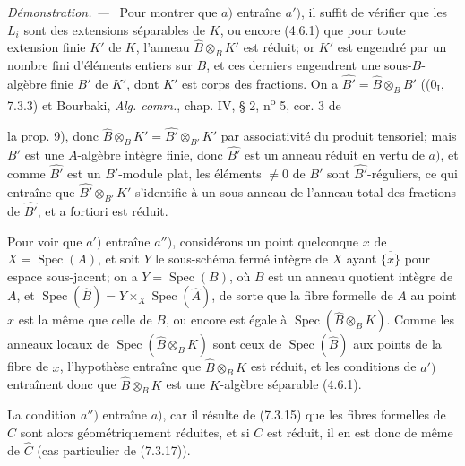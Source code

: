 \documentclass[10pt,oneside]{book}
\newcommand{\oldpage}[2][]{%
  \setcounter{footnote}{0}%
  \marginpar{\scriptsize\textbf{#1}~|~#2}\ignorespaces}
\newenvironment{proof}{%
  \par\medskip\noindent\textit{Démonstration. ---\ }}{\par}
\begin{document}
\begin{proof}
Pour montrer que $a)$ entraîne $a')$, il suffit de vérifier que les $L_i$ sont
des extensions séparables de $K$, ou encore (4.6.1) que pour toute extension
finie $K'$ de $K$, l'anneau $\widehat B\otimes_BK'$ est réduit; or $K'$ est
engendré par un nombre fini d'éléments entiers sur $B$, et ces derniers
engendrent une sous-$B$-algèbre finie $B'$ de $K'$, dont $K'$ est corps des
fractions. On a $\widehat{B'}=\widehat B\otimes_BB'$
((0$_{\mathrm I}$, 7.3.3) et Bourbaki, \emph{Alg. comm.}, chap. IV, § 2,
n\textsuperscript{o} 5, cor. 3 de

\oldpage[IV-2]{210}

la prop. 9), donc
$\widehat B\otimes_BK'=\widehat{B'}\otimes_{B'}K'$ par associativité du produit
tensoriel; mais $B'$ est une $A$-algèbre intègre finie, donc $\widehat{B'}$ est
un anneau réduit en vertu de $a)$, et comme $\widehat{B'}$ est un $B'$-module
plat, les éléments $\neq0$ de $B'$ sont $\widehat{B'}$-réguliers, ce qui
entraîne que $\widehat{B'}\otimes_{B'}K'$ s'identifie à un sous-anneau de
l'anneau total des fractions de $\widehat{B'}$, et a fortiori est réduit.

Pour voir que $a')$ entraîne $a'')$, considérons un point quelconque $x$ de
$X=\operatorname{Spec}(A)$, et soit $Y$ le sous-schéma fermé intègre de $X$
ayant $\overline{\{x\}}$ pour espace sous-jacent; on a
$Y=\operatorname{Spec}(B)$, où $B$ est un anneau quotient intègre de $A$, et
$\operatorname{Spec}(\widehat B)=Y\times_X\operatorname{Spec}(\widehat A)$,
de sorte que la fibre formelle de $A$ au point $x$ est la même que celle de
$B$, ou encore est égale à $\operatorname{Spec}(\widehat B\otimes_BK)$. Comme
les anneaux locaux de $\operatorname{Spec}(\widehat B\otimes_BK)$ sont ceux de
$\operatorname{Spec}(\widehat B)$ aux points de la fibre de $x$, l'hypothèse
entraîne que $\widehat B\otimes_BK$ est réduit, et les conditions de $a')$
entraînent donc que $\widehat B\otimes_BK$ est une $K$-algèbre séparable
(4.6.1).

La condition $a'')$ entraîne $a)$, car il résulte de (7.3.15) que les fibres
formelles de $C$ sont alors géométriquement réduites, et si $C$ est réduit, il
en est donc de même de $\widehat C$ (cas particulier de (7.3.17)).


\end{proof}
\end{document}
